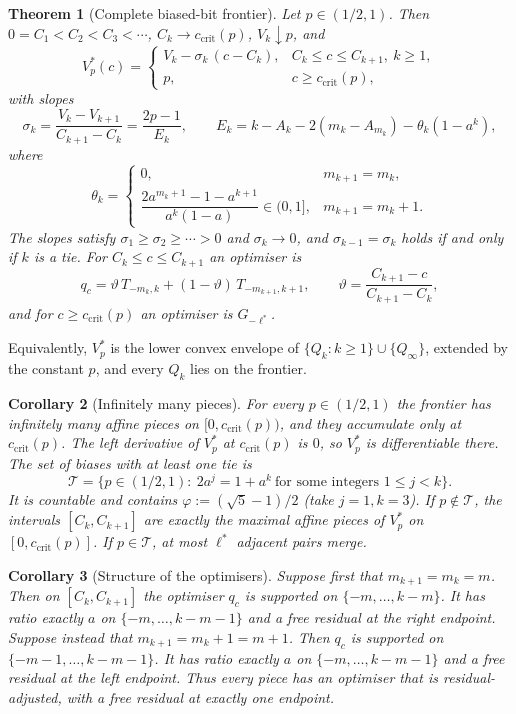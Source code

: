 \documentclass{article}
\newtheorem{theorem}{Theorem}[section]
\newtheorem{corollary}[theorem]{Corollary}
\theoremstyle{definition}
\theoremstyle{remark}
\newcommand{\ccrit}{c_{\mathrm{crit}}}
\begin{document}
\begin{theorem}[Complete biased-bit frontier]\label{thm:frontier}
Let \(p\in(1/2,1)\). Then \(0=C_1<C_2<C_3<\cdots\), \(C_k\to\ccrit(p)\), \(V_k\downarrow p\), and
\[
V_p^*(c)=\begin{cases}
V_k-\sigma_k\,(c-C_k), & C_k\le c\le C_{k+1},\ k\ge1,\\
p, & c\ge\ccrit(p),
\end{cases}
\]
with slopes
\[
\sigma_k=\frac{V_k-V_{k+1}}{C_{k+1}-C_k}=\frac{2p-1}{E_k},\qquad E_k=k-A_k-2(m_k-A_{m_k})-\theta_k(1-a^k),
\]
where
\[
\theta_k=\begin{cases}0,& m_{k+1}=m_k,\\[1mm] \dfrac{2a^{m_k+1}-1-a^{k+1}}{a^k(1-a)}\in(0,1],& m_{k+1}=m_k+1.\end{cases}
\]
The slopes satisfy \(\sigma_1\ge\sigma_2\ge\cdots>0\) and \(\sigma_k\to0\), and \(\sigma_{k-1}=\sigma_k\) holds if and only if \(k\) is a tie. For \(C_k\le c\le C_{k+1}\) an optimiser is
\[
q_c=\vartheta\,T_{-m_k,k}+(1-\vartheta)\,T_{-m_{k+1},k+1},\qquad \vartheta=\frac{C_{k+1}-c}{C_{k+1}-C_k},
\]
and for \(c\ge\ccrit(p)\) an optimiser is \(G_{-\ell^*}\).
\end{theorem}

Equivalently, \(V_p^*\) is the lower convex envelope of \(\{Q_k:k\ge1\}\cup\{Q_\infty\}\), extended by the constant \(p\), and every \(Q_k\) lies on the frontier.

\begin{corollary}[Infinitely many pieces]\label{cor:pieces}
For every \(p\in(1/2,1)\) the frontier has infinitely many affine pieces on \([0,\ccrit(p))\), and they accumulate only at \(\ccrit(p)\). The left derivative of \(V_p^*\) at \(\ccrit(p)\) is \(0\), so \(V_p^*\) is differentiable there. The set of biases with at least one tie is
\[
\mathcal T=\{p\in(1/2,1):\ 2a^j=1+a^k\ \text{for some integers }1\le j<k\}.
\]
It is countable and contains \(\varphi:=(\sqrt5-1)/2\) (take \(j=1,k=3\)). If \(p\notin\mathcal T\), the intervals \([C_k,C_{k+1}]\) are exactly the maximal affine pieces of \(V_p^*\) on \([0,\ccrit(p)]\). If \(p\in\mathcal T\), at most \(\ell^*\) adjacent pairs merge.
\end{corollary}

\begin{corollary}[Structure of the optimisers]\label{cor:structure}
Suppose first that \(m_{k+1}=m_k=m\). Then on \([C_k,C_{k+1}]\) the optimiser \(q_c\) is supported on \(\{-m,\dots,k-m\}\). It has ratio exactly \(a\) on \(\{-m,\dots,k-m-1\}\) and a free residual at the right endpoint. Suppose instead that \(m_{k+1}=m_k+1=m+1\). Then \(q_c\) is supported on \(\{-m-1,\dots,k-m-1\}\). It has ratio exactly \(a\) on \(\{-m,\dots,k-m-1\}\) and a free residual at the left endpoint. Thus every piece has an optimiser that is residual-adjusted, with a free residual at exactly one endpoint.
\end{corollary}
\end{document}
